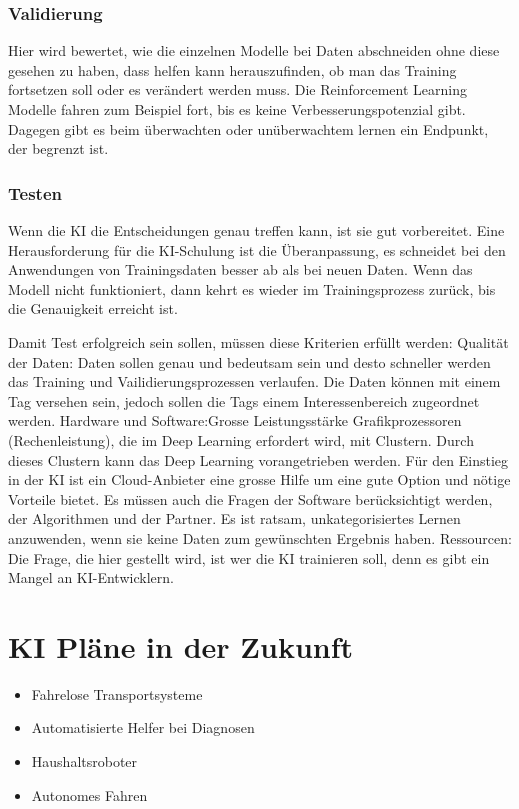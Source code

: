 \documentclass{report}
\begin{document}
\subsubsection{Validierung} 
Hier wird bewertet, wie die einzelnen Modelle bei Daten abschneiden ohne diese gesehen zu haben, dass helfen kann herauszufinden, ob man das Training fortsetzen soll oder es verändert werden muss. Die Reinforcement Learning Modelle fahren zum Beispiel fort, bis es keine Verbesserungspotenzial gibt. Dagegen gibt es beim überwachten oder unüberwachtem lernen ein Endpunkt, der begrenzt ist. 

\subsubsection{Testen} 
Wenn die KI die Entscheidungen genau treffen kann, ist sie gut vorbereitet. Eine Herausforderung für die KI-Schulung ist die Überanpassung, es schneidet bei den Anwendungen von Trainingsdaten besser ab als bei neuen Daten. Wenn das Modell nicht funktioniert, dann kehrt es wieder im Trainingsprozess zurück, bis die Genauigkeit erreicht ist. 

Damit Test erfolgreich sein sollen, müssen diese Kriterien erfüllt werden:
Qualität der Daten: Daten sollen genau und bedeutsam sein und desto schneller werden das Training und Vailidierungsprozessen verlaufen.  Die Daten können mit einem Tag versehen sein, jedoch sollen die Tags einem Interessenbereich zugeordnet werden. 
Hardware und Software:Grosse Leistungsstärke Grafikprozessoren (Rechenleistung), die im Deep Learning erfordert wird, mit Clustern. Durch dieses Clustern kann das Deep Learning vorangetrieben werden.  Für den Einstieg in der KI ist ein Cloud-Anbieter eine grosse Hilfe um eine gute Option und nötige Vorteile bietet. Es müssen auch die Fragen der Software berücksichtigt werden, der Algorithmen und der Partner. Es ist ratsam, unkategorisiertes Lernen anzuwenden, wenn sie keine Daten zum gewünschten Ergebnis haben.
Ressourcen:
Die Frage, die hier gestellt wird, ist wer die KI trainieren soll, denn es gibt ein Mangel an KI-Entwicklern. 

\section {KI Pläne in der Zukunft}
\begin{itemize}
    \item Fahrelose Transportsysteme
    \item Automatisierte Helfer bei Diagnosen
    \item Haushaltsroboter 
    \item Autonomes Fahren
\end{itemize}

\nocite{*}
\printbibliography
\end{document}
